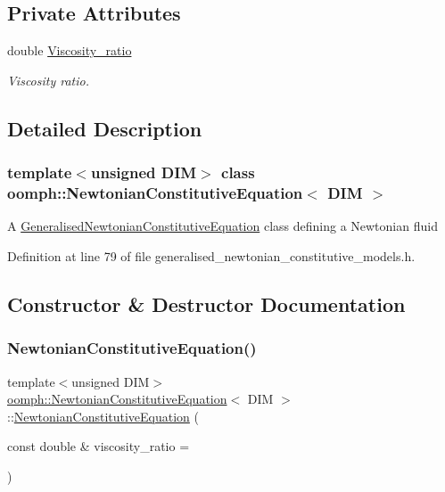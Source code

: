 \subsection*{Private Attributes}
\begin{DoxyCompactItemize}
\item 
double \hyperlink{classoomph_1_1NewtonianConstitutiveEquation_a3c00cad22057ad703ce1b7f169cdc713}{Viscosity\+\_\+ratio}
\begin{DoxyCompactList}\small\item\em Viscosity ratio. \end{DoxyCompactList}\end{DoxyCompactItemize}


\subsection{Detailed Description}
\subsubsection*{template$<$unsigned D\+IM$>$\newline
class oomph\+::\+Newtonian\+Constitutive\+Equation$<$ D\+I\+M $>$}

A \hyperlink{classoomph_1_1GeneralisedNewtonianConstitutiveEquation}{Generalised\+Newtonian\+Constitutive\+Equation} class defining a Newtonian fluid 

Definition at line 79 of file generalised\+\_\+newtonian\+\_\+constitutive\+\_\+models.\+h.



\subsection{Constructor \& Destructor Documentation}
\mbox{\label{classoomph_1_1NewtonianConstitutiveEquation_aaa9259f124864ea37f8d30e7f884c41b}} 
\subsubsection{\texorpdfstring{Newtonian\+Constitutive\+Equation()}{NewtonianConstitutiveEquation()}}
{\footnotesize\ttfamily template$<$unsigned D\+IM$>$ \\
\hyperlink{classoomph_1_1NewtonianConstitutiveEquation}{oomph\+::\+Newtonian\+Constitutive\+Equation}$<$ D\+IM $>$\+::\hyperlink{classoomph_1_1NewtonianConstitutiveEquation}{Newtonian\+Constitutive\+Equation} (\begin{DoxyParamCaption}\item[{const double \&}]{viscosity\+\_\+ratio = {} }\end{DoxyParamCaption})\hspace{0.3cm}{\ttfamily [inline]}}



